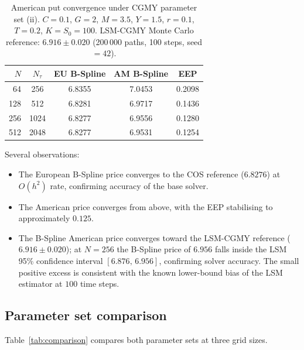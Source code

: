 \documentclass[11pt,a4paper]{article}
\begin{document}
\begin{table}[ht]
\centering
\caption{American put convergence under CGMY parameter set (ii).
  $C=0.1$, $G=2$, $M=3.5$, $Y=1.5$, $r=0.1$, $T=0.2$, $K=S_0=100$.
  LSM-CGMY Monte Carlo reference: $6.916\pm 0.020$
  (200\,000 paths, 100 steps, seed $=42$).}
\label{tab:convergence}
\begin{tabular}{rcccc}
\toprule
$N$ & $N_\tau$ & EU B-Spline & AM B-Spline & EEP \\
\midrule
 64 &  256 & 6.8355 & 7.0453 & 0.2098 \\
128 &  512 & 6.8281 & 6.9717 & 0.1436 \\
256 & 1024 & 6.8277 & 6.9556 & 0.1280 \\
512 & 2048 & 6.8277 & 6.9531 & 0.1254 \\
\bottomrule
\end{tabular}
\end{table}

Several observations:
\begin{itemize}
  \item The European B-Spline price converges to the COS reference
    ($6.8276$) at $O(h^2)$ rate, confirming accuracy of the base solver.
  \item The American price converges from above, with the EEP stabilising
    to approximately $0.125$.
  \item The B-Spline American price converges toward the LSM-CGMY reference
    ($6.916\pm 0.020$); at $N=256$ the B-Spline price of $6.956$ falls inside
    the LSM 95\% confidence interval $[6.876,\,6.956]$, confirming solver
    accuracy.  The small positive excess is consistent with the known
    lower-bound bias of the LSM estimator at $100$ time steps.
\end{itemize}

\subsection{Parameter set comparison}

Table~\ref{tab:comparison} compares both parameter sets at three grid sizes.
\end{document}
